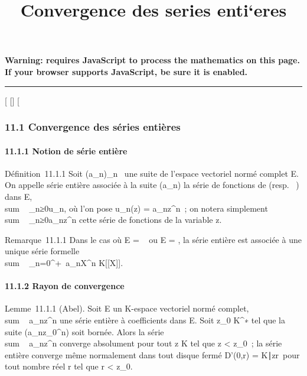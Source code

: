 \documentclass[]{article}
\title{Convergence des series enti`eres}
\author{}
\date{}
\begin{document}
\maketitle

\textbf{Warning: 
requires JavaScript to process the mathematics on this page.\\ If your
browser supports JavaScript, be sure it is enabled.}

\begin{center}\rule{3in}{0.4pt}\end{center}

{[}
{[}{]}
{[}

\subsubsection{11.1 Convergence des séries entières}

\paragraph{11.1.1 Notion de série entière}

Définition~11.1.1 Soit (a_n)_n\in{}~ une suite de l'espace
vectoriel normé complet E. On appelle série entière associée à la suite
(a_n) la série de fonctions de  (resp. ~) dans E,
\\sum ~
_n≥0u_n, où l'on pose u_n(z) =
a_nz^n~; on notera simplement
\\sum ~
_n≥0a_nz^n cette série de fonctions de la
variable z.

Remarque~11.1.1 Dans le cas où E = ~ ou E = , la série entière est
associée à une unique série formelle
\\sum ~
_n=0^+\infty~a_nX^n \in K{[}{[}X{]}{]}.

\paragraph{11.1.2 Rayon de convergence}

Lemme~11.1.1 (Abel). Soit E un K-espace vectoriel normé complet,
\\sum ~
a_nz^n une série entière à coefficients dans E. Soit
z_0 \in K^∗ tel que la suite
(a_nz_0^n) soit bornée. Alors la série
\\sum ~
a_nz^n converge absolument pour tout z \in K tel que
z \textless{} z_0~; la
série entière converge même normalement dans tout disque fermé D'(0,r) =
\z \in
K∣z\leq r\
pour tout nombre réel r tel que r \textless{}
z_0.
\end{document}
